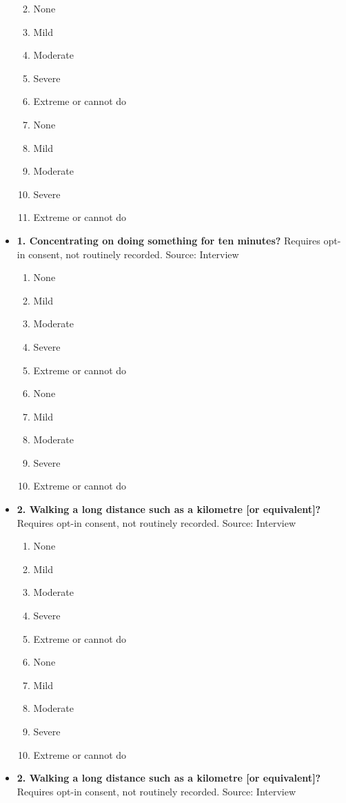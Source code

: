 \documentclass[
]{scrartcl}
\providecommand{\tightlist}{%
  \setlength{\itemsep}{0pt}\setlength{\parskip}{0pt}}\usepackage{longtable,booktabs,array}
\begin{document}
\begin{itemize}
  \begin{enumerate}
  \def\labelenumi{\arabic{enumi}.}
  \tightlist
  \item
    None
  \item
    Mild
  \item
    Moderate
  \item
    Severe
  \item
    Extreme or cannot do
  \item
    None
  \item
    Mild
  \item
    Moderate
  \item
    Severe
  \item
    Extreme or cannot do
  \end{enumerate}
\item
  \textbf{1. Concentrating on doing something for ten minutes?} Requires
  opt-in consent, not routinely recorded. Source: Interview

  \begin{enumerate}
  \def\labelenumi{\arabic{enumi}.}
  \tightlist
  \item
    None
  \item
    Mild
  \item
    Moderate
  \item
    Severe
  \item
    Extreme or cannot do
  \item
    None
  \item
    Mild
  \item
    Moderate
  \item
    Severe
  \item
    Extreme or cannot do
  \end{enumerate}
\item
  \textbf{2. Walking a long distance such as a kilometre {[}or
  equivalent{]}?} Requires opt-in consent, not routinely recorded.
  Source: Interview

  \begin{enumerate}
  \def\labelenumi{\arabic{enumi}.}
  \tightlist
  \item
    None
  \item
    Mild
  \item
    Moderate
  \item
    Severe
  \item
    Extreme or cannot do
  \item
    None
  \item
    Mild
  \item
    Moderate
  \item
    Severe
  \item
    Extreme or cannot do
  \end{enumerate}
\item
  \textbf{2. Walking a long distance such as a kilometre {[}or
  equivalent{]}?} Requires opt-in consent, not routinely recorded.
  Source: Interview


\end{itemize}
\end{document}
